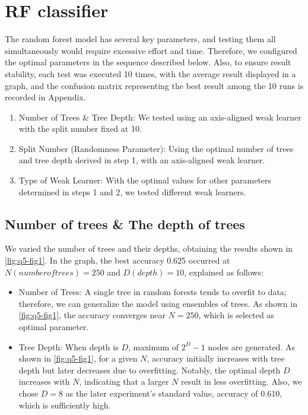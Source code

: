 \section{RF classifier}
\label{sec:intro}

The random forest model has several key parameters, and testing them all simultaneously would require excessive effort and time. Therefore, we configured the optimal parameters in the sequence described below. Also, to ensure result stability, each test was executed 10 times, with the average result displayed in a graph, and the confusion matrix representing the best result among the 10 runs is recorded in Appendix.
\begin{enumerate}
	\item Number of Trees \& Tree Depth: We tested using an axis-aligned weak learner with the split number fixed at 10.
	\item Split Number (Randomness Parameter): Using the optimal number of trees and tree depth derived in step 1, with an axis-aligned weak learner.
	\item Type of Weak Learner: With the optimal values for other parameters determined in steps 1 and 2, we tested different weak learners.
\end{enumerate}

\subsection{Number of trees \& The depth of trees}
We varied the number of trees and their depths, obtaining the results shown in \cref{fig:q5-fig1}. In the graph, the best accuracy 0.625 occurred at $N(number of trees)=250$ and $D(depth)=10$, explained as follows:
\begin{itemize}
	\item Number of Trees: A single tree in random forests tends to overfit to data; therefore, we can generalize the model using ensembles of trees. As shown in \cref{fig:q5-fig1}, the accuracy converges near $N=250$, which is selected as optimal parameter.
	\item Tree Depth: When depth is $D$, maximum of $2^D-1$ nodes are generated. As shown in \cref{fig:q5-fig1}, for a given $N$, accuracy initially increases with tree depth but later decreases due to overfitting. Notably, the optimal depth $D$ increases with $N$, indicating that a larger $N$ result in less overfitting. Also, we chose $D=8$ as the later experiment's standard value, accuracy of 0.610, which is sufficiently high.
\end{itemize}

